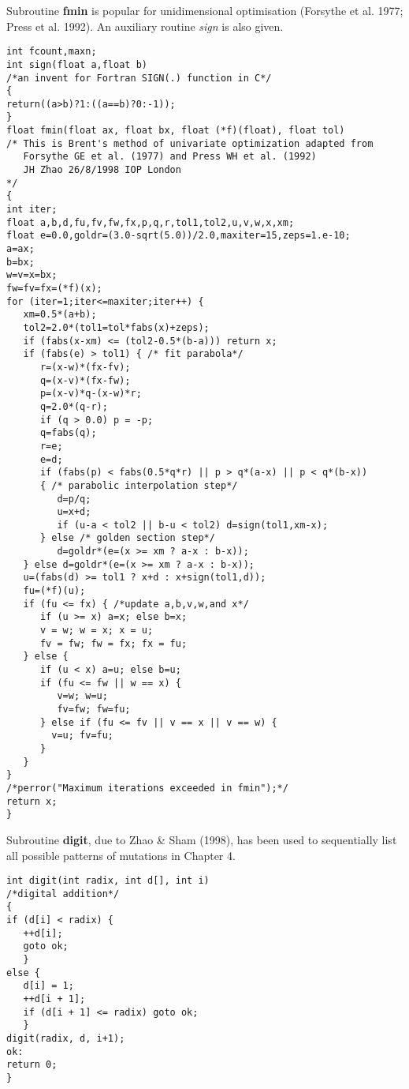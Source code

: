 \noindent Subroutine {\bf fmin} is popular for unidimensional optimisation
(Forsythe et al.  1977; Press et al.  1992).  An auxiliary routine {\em sign}
is also given.
\begin{verbatim}
int fcount,maxn;
int sign(float a,float b)
/*an invent for Fortran SIGN(.) function in C*/
{
return((a>b)?1:((a==b)?0:-1));
}
float fmin(float ax, float bx, float (*f)(float), float tol)
/* This is Brent's method of univariate optimization adapted from
   Forsythe GE et al. (1977) and Press WH et al. (1992)
   JH Zhao 26/8/1998 IOP London
*/
{
int iter;
float a,b,d,fu,fv,fw,fx,p,q,r,tol1,tol2,u,v,w,x,xm;
float e=0.0,goldr=(3.0-sqrt(5.0))/2.0,maxiter=15,zeps=1.e-10;
a=ax;
b=bx;
w=v=x=bx;
fw=fv=fx=(*f)(x);
for (iter=1;iter<=maxiter;iter++) {
   xm=0.5*(a+b);
   tol2=2.0*(tol1=tol*fabs(x)+zeps);
   if (fabs(x-xm) <= (tol2-0.5*(b-a))) return x;
   if (fabs(e) > tol1) { /* fit parabola*/
      r=(x-w)*(fx-fv);
      q=(x-v)*(fx-fw);
      p=(x-v)*q-(x-w)*r;
      q=2.0*(q-r);
      if (q > 0.0) p = -p;
      q=fabs(q);
      r=e;
      e=d;
      if (fabs(p) < fabs(0.5*q*r) || p > q*(a-x) || p < q*(b-x))
      { /* parabolic interpolation step*/
         d=p/q;
         u=x+d;
         if (u-a < tol2 || b-u < tol2) d=sign(tol1,xm-x);
      } else /* golden section step*/
         d=goldr*(e=(x >= xm ? a-x : b-x));
   } else d=goldr*(e=(x >= xm ? a-x : b-x));
   u=(fabs(d) >= tol1 ? x+d : x+sign(tol1,d));
   fu=(*f)(u);
   if (fu <= fx) { /*update a,b,v,w,and x*/
      if (u >= x) a=x; else b=x;
      v = w; w = x; x = u;
      fv = fw; fw = fx; fx = fu;
   } else {
      if (u < x) a=u; else b=u;
      if (fu <= fw || w == x) {
         v=w; w=u;
         fv=fw; fw=fu;
      } else if (fu <= fv || v == x || v == w) {
        v=u; fv=fu;
      }
   }
}
/*perror("Maximum iterations exceeded in fmin");*/
return x;
}
\end{verbatim}

\noindent Subroutine {\bf digit}, due to Zhao \& Sham (1998), has been used to
sequentially list all possible patterns of mutations in Chapter 4.
\begin{verbatim}
int digit(int radix, int d[], int i)
/*digital addition*/
{
if (d[i] < radix) {
   ++d[i];
   goto ok;
   }
else {
   d[i] = 1;
   ++d[i + 1];
   if (d[i + 1] <= radix) goto ok;
   }
digit(radix, d, i+1);
ok:
return 0;
}
\end{verbatim}

